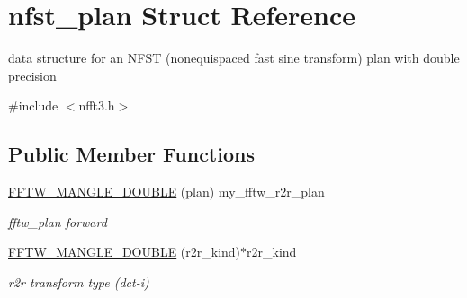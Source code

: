 \hypertarget{structnfst__plan}{\section{nfst\-\_\-plan Struct Reference}
\label{structnfst__plan}
}


data structure for an N\-F\-S\-T (nonequispaced fast sine transform) plan with double precision  




{\ttfamily \#include $<$nfft3.\-h$>$}

\subsection*{Public Member Functions}
\begin{DoxyCompactItemize}
\item 
\hypertarget{structnfst__plan_ac3c18cc4dec9293352c508e9999ebf05}{\hyperlink{structnfst__plan_ac3c18cc4dec9293352c508e9999ebf05}{F\-F\-T\-W\-\_\-\-M\-A\-N\-G\-L\-E\-\_\-\-D\-O\-U\-B\-L\-E} (plan) my\-\_\-fftw\-\_\-r2r\-\_\-plan}\label{structnfst__plan_ac3c18cc4dec9293352c508e9999ebf05}

\begin{DoxyCompactList}\small\item\em fftw\-\_\-plan forward \end{DoxyCompactList}\item 
\hypertarget{structnfst__plan_abeeca1317cee53206b64c79f3de094c2}{\hyperlink{structnfst__plan_abeeca1317cee53206b64c79f3de094c2}{F\-F\-T\-W\-\_\-\-M\-A\-N\-G\-L\-E\-\_\-\-D\-O\-U\-B\-L\-E} (r2r\-\_\-kind)$\ast$r2r\-\_\-kind}\label{structnfst__plan_abeeca1317cee53206b64c79f3de094c2}

\begin{DoxyCompactList}\small\item\em r2r transform type (dct-\/i) \end{DoxyCompactList}\end{DoxyCompactItemize}
